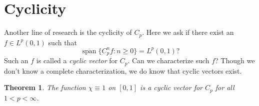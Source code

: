 \documentclass[11pt]{amsart}
\numberwithin{equation}{section}
\theoremstyle{plain}
\newtheorem{Theorem}[equation]{Theorem}
\theoremstyle{definition}
\renewcommand{\leq}{\leqslant}
\renewcommand{\geq}{\geqslant}
\renewcommand{\subset}{\subseteq}
\renewcommand{\Re}[1]{\operatorname{Re} #1 }
\newcommand{\0}{{\color{lightgray}0}}
\begin{document}



\section{Cyclicity}\label{Cy}

Another line of research is the cyclicity of $C_p$. Here we ask if there exist an $f \in L^p(0, 1)$ such that 
$$\overline{\operatorname{span}}\{C_{p}^{n} f: n \geq 0\} = L^p(0, 1)?$$ Such an $f$ is called a {\em cyclic vector} for $C_p$. Can we characterize such $f$? Though we don't know a complete characterization, we do know that cyclic vectors exist. 

\begin{Theorem}
The function $\chi \equiv 1$ on $[0, 1]$ is a cyclic vector for $C_p$ for all $1 < p < \infty$. 
\end{Theorem}
\end{document}
